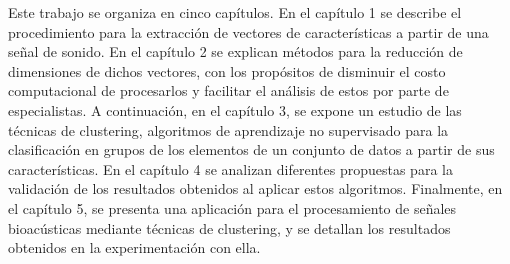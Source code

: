 Este trabajo se organiza en cinco capítulos.
En el capítulo 1 se describe el procedimiento para la extracción de vectores de características a partir de una señal de sonido.
En el capítulo 2 se explican métodos para la reducción de dimensiones de dichos vectores, con los propósitos de disminuir el costo computacional de procesarlos y facilitar el análisis de estos por parte de especialistas.
A continuación, en el capítulo 3, se expone un estudio de las técnicas de clustering, algoritmos de aprendizaje no supervisado para la clasificación en grupos de los elementos de un conjunto de datos a partir de sus características.
En el capítulo 4 se analizan diferentes propuestas para la validación de los resultados obtenidos al aplicar estos algoritmos.
Finalmente, en el capítulo 5, se presenta una aplicación para el procesamiento de señales bioacústicas mediante técnicas de clustering, y se detallan los resultados obtenidos en la experimentación con ella.
